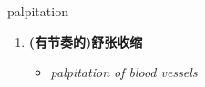
\begin{frame}
{\huge palpitation}
\begin{center}
\begin{enumerate}\Large
  \item \textbf{(有节奏的)舒张收缩}
  \begin{itemize}
    \item \em{\Large{palpitation of blood vessels}}
  \end{itemize}
\end{enumerate}
\end{center}
\end{frame}
